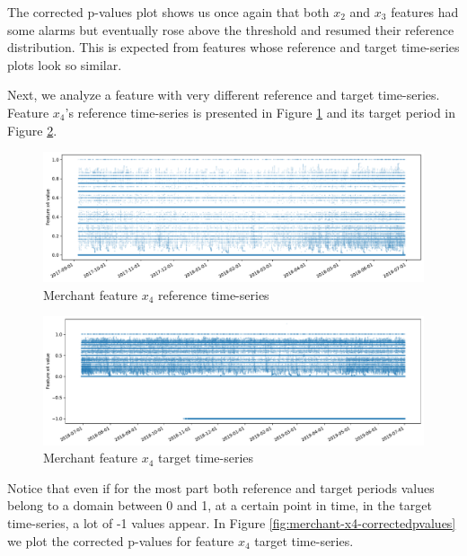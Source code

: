 The corrected p-values plot shows us once again that both $x_2$ and $x_3$ features had some alarms but eventually rose above the threshold and resumed their reference distribution. This is expected from features whose reference and target time-series plots look so similar.

Next, we analyze a feature with very different reference and target time-series. Feature $x_4$'s reference time-series is presented in Figure \ref{fig:merchant-x4-reference} and its target period in Figure \ref{fig:merchant-x4-target}.
\begin{figure}[!htb]
    \begin{center}
      \includegraphics[scale=0.5]{figures/merchant-x4-reference.pdf}
      \caption{Merchant feature $x_4$ reference time-series}
      \label{fig:merchant-x4-reference}
    \end{center}
\end{figure}
\begin{figure}[!htb]
    \begin{center}
      \includegraphics[scale=0.5]{figures/merchant-x4-target.pdf}
      \caption{Merchant feature $x_4$ target time-series}
      \label{fig:merchant-x4-target}
    \end{center}
\end{figure}
Notice that even if for the most part both reference and target periods values belong to a domain between 0 and 1, at a certain point in time, in the target time-series, a lot of -1 values appear. In Figure \ref{fig:merchant-x4-correctedpvalues} we plot the corrected p-values for feature $x_4$ target time-series.
